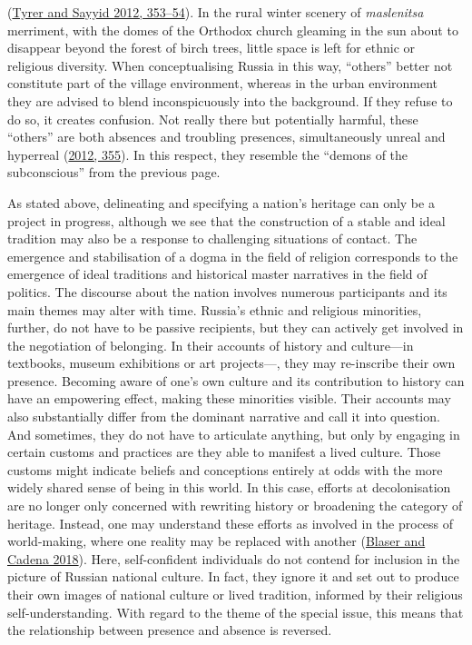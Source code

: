 \documentclass[
  english,
  a4paper,
  DIV=12,
  footlines=2.1,
  usegeometry=true]{scrartcl}
\begin{document}
(\protect\hyperlink{ref-tyrer_governing_2012}{Tyrer and Sayyid 2012,
353--54}). In the rural winter scenery of \emph{maslenitsa} merriment,
with the domes of the Orthodox church gleaming in the sun about to
disappear beyond the forest of birch trees, little space is left for
ethnic or religious diversity. When conceptualising Russia in this way,
``others'' better not constitute part of the village environment,
whereas in the urban environment they are advised to blend
inconspicuously into the background. If they refuse to do so, it creates
confusion. Not really there but potentially harmful, these ``others''
are both absences and troubling presences, simultaneously unreal and
hyperreal (\protect\hyperlink{ref-tyrer_governing_2012}{2012, 355}). In
this respect, they resemble the ``demons of the subconscious'' from the
previous page.

\leavevmode\marginpar{\textcolor{parnum}{{[}13{]}}}As stated above,
delineating and specifying a nation's heritage can only be a project in
progress, although we see that the construction of a stable and ideal
tradition may also be a response to challenging situations of contact.
The emergence and stabilisation of a dogma in the field of religion
corresponds to the emergence of ideal traditions and historical master
narratives in the field of politics. The discourse about the nation
involves numerous participants and its main themes may alter with time.
Russia's ethnic and religious minorities, further, do not have to be
passive recipients, but they can actively get involved in the
negotiation of belonging. In their accounts of history and culture---in
textbooks, museum exhibitions or art projects---, they may re-inscribe
their own presence. Becoming aware of one's own culture and its
contribution to history can have an empowering effect, making these
minorities visible. Their accounts may also substantially differ from
the dominant narrative and call it into question. And sometimes, they do
not have to articulate anything, but only by engaging in certain customs
and practices are they able to manifest a lived culture. Those customs
might indicate beliefs and conceptions entirely at odds with the more
widely shared sense of being in this world. In this case, efforts at
decolonisation are no longer only concerned with rewriting history or
broadening the category of heritage. Instead, one may understand these
efforts as involved in the process of world-making, where one reality
may be replaced with another
(\protect\hyperlink{ref-blaser_pluriverse_2018}{Blaser and Cadena
2018}). Here, self-confident individuals do not contend for inclusion in
the picture of Russian national culture. In fact, they ignore it and set
out to produce their own images of national culture or lived tradition,
informed by their religious self-understanding. With regard to the theme
of the special issue, this means that the relationship between presence
and absence is reversed.
\end{document}
